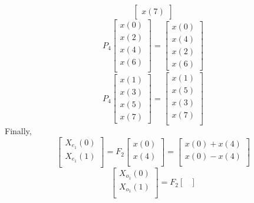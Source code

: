 \documentclass[journal,12pt,twocolumn]{IEEEtran}
\renewcommand\thesection{\arabic{section}}
\begin{document}
\begin{enumerate}[label=\thesection.\arabic*.,ref=\thesection.\theenumi]
\begin{equation}
\begin{bmatrix}
x(7)
\end{bmatrix}
\end{equation}
\begin{equation}
P_{4}
\begin{bmatrix}
x(0) \\ 
x(2) \\ 
x(4) \\ 
x(6) \\
\end{bmatrix}
= 
\begin{bmatrix}
x(0) \\ 
x(4) \\ 
x(2) \\
x(6)
\end{bmatrix}
\end{equation}
\begin{equation}
P_{4}
\begin{bmatrix}
x(1) \\ 
x(3) \\ 
x(5) \\
x(7)
\end{bmatrix}
= 
\begin{bmatrix}
x(1) \\ 
x(5) \\ 
x(3) \\ 
x(7) \\
\end{bmatrix}
\end{equation}
Finally,
\begin{equation}
\begin{bmatrix}
X_{e_{1}}(0) \\ 
X_{e_{1}}(1)\\ 
\end{bmatrix}
= F_{2}
\begin{bmatrix}
x(0) \\ 
x(4) \\ 
\end{bmatrix}
=
\begin{bmatrix}
x(0)+x(4) \\ 
x(0)-x(4) \\ 
\end{bmatrix}
\end{equation}
\begin{equation}
\begin{bmatrix}
X_{o_{1}}(0) \\ 
X_{o_{1}}(1)\\ 
\end{bmatrix}
= F_{2}
\begin{bmatrix}

\end{bmatrix}
\end{equation}
\end{enumerate}
\end{document}
